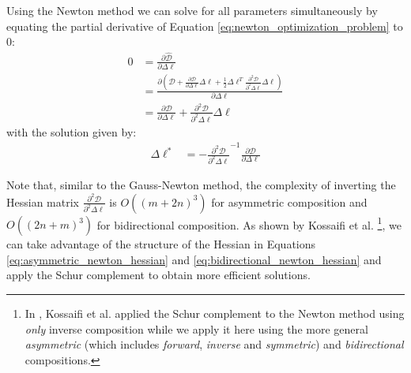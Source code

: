 Using the Newton method we can solve for all parameters simultaneously by equating the partial derivative of Equation \ref{eq:newton_optimization_problem} to $0$:
\begin{equation}
    \begin{aligned}
    	0 & = \frac{\partial\hat{\mathcal{D}}}{\partial \Delta \boldsymbol{\ell}}
    	\\
    	& = \frac{\partial \left(\mathcal{D} + \frac{\partial \mathcal{D}}{\partial \Delta \boldsymbol{\ell}} \Delta \boldsymbol{\ell} + \frac{1}{2} \Delta \boldsymbol{\ell}^T \frac{\partial^2 \mathcal{D}}{\partial^2 \Delta \boldsymbol{\ell}} \Delta \boldsymbol{\ell} \right)}{\partial \Delta \boldsymbol{\ell}}
    	\\
		& = \frac{\partial \mathcal{D}}{\partial \Delta \boldsymbol{\ell}} + \frac{\partial^2 \mathcal{D}}{\partial^2 \Delta \boldsymbol{\ell}} \Delta \boldsymbol{\ell}
    \label{eq:ssd_bc}
    \end{aligned}
\end{equation}
with the solution given by:
\begin{equation}
    \begin{aligned}
    	\Delta \boldsymbol{\ell}^* & = -\frac{\partial^2 \mathcal{D}}{\partial^2 \Delta \boldsymbol{\ell}}^{-1} \frac{\partial \mathcal{D}}{\partial \Delta \boldsymbol{\ell}}
    \label{eq:ssd_bc}
    \end{aligned}
\end{equation}

Note that, similar to the Gauss-Newton method, the complexity of inverting the Hessian matrix $\frac{\partial^2 \mathcal{D}}{\partial^2 \Delta \boldsymbol{\ell}}$ is $O((m+2n)^3)$ for asymmetric composition and $O((2n + m)^3)$ for bidirectional composition. As shown by Kossaifi et al. \cite{Kossaifi2014}\footnote{In \cite{Kossaifi2014}, Kossaifi et al. applied the Schur complement to the Newton method using \emph{only} inverse composition while we apply it here using the more general \emph{asymmetric} (which includes \emph{forward}, \emph{inverse} and \emph{symmetric}) and \emph{bidirectional} compositions.}, we can take advantage of the structure of the Hessian in Equations \ref{eq:asymmetric_newton_hessian} and \ref{eq:bidirectional_newton_hessian} and apply the Schur complement to obtain more efficient solutions.


